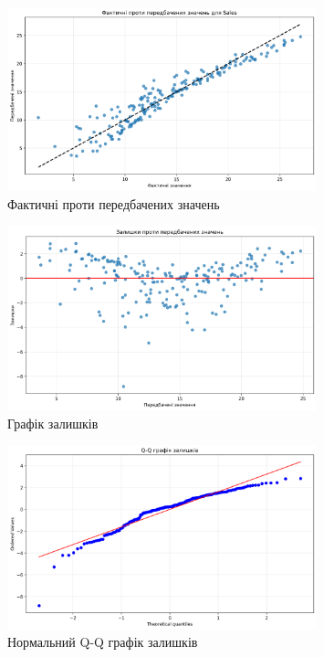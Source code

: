 \documentclass{article}
\begin{document}
    \vspace{1cm}
    
    \begin{figure}[H]
       \centering
       \includegraphics[width=0.8\textwidth]{actual_vs_predicted.png}
       \caption{Фактичні проти передбачених значень}
       \label{fig:фактичні_проти_передбачених_значень}
    \end{figure}

    \vspace{0.5cm}
    
    \begin{figure}[H]
       \centering
       \includegraphics[width=0.8\textwidth]{residuals.png}
       \caption{Графік залишків}
       \label{fig:графік_залишків}
    \end{figure}

    \vspace{0.5cm}
    
    \begin{figure}[H]
       \centering
       \includegraphics[width=0.8\textwidth]{qq_plot.png}
       \caption{Нормальний Q-Q графік залишків}
       \label{fig:нормальний_q-q_графік_залишків}
    \end{figure}
\end{document}
